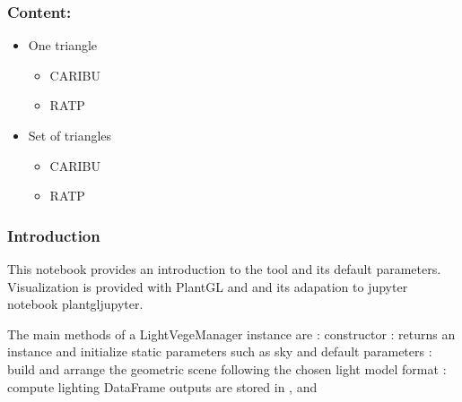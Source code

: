 \documentclass[letterpaper,10pt,english]{sphinxmanual}
\begin{document}
\subsubsection{Content:}
\label{\detokenize{tool_basics:Content:}}\begin{itemize}
\item {} 
\sphinxAtStartPar
One triangle
\begin{itemize}
\item {} 
\sphinxAtStartPar
CARIBU

\item {} 
\sphinxAtStartPar
RATP

\end{itemize}

\item {} 
\sphinxAtStartPar
Set of triangles
\begin{itemize}
\item {} 
\sphinxAtStartPar
CARIBU

\item {} 
\sphinxAtStartPar
RATP

\end{itemize}

\end{itemize}


\subsubsection{Introduction}
\label{\detokenize{tool_basics:Introduction}}
\sphinxAtStartPar
This notebook provides an introduction to the tool and its default parameters. Visualization is provided with PlantGL and and its adapation to jupyter notebook plantgl\sphinxhyphen{}jupyter.

\sphinxAtStartPar
The main methods of a LightVegeManager instance are : \sphinxhyphen{} constructor : returns an instance and initialize static parameters such as sky and default parameters \sphinxhyphen{} : build and arrange the geometric scene following the chosen light model format \sphinxhyphen{} : compute lighting \sphinxhyphen{} DataFrame outputs are stored in ,  and 
\end{document}
